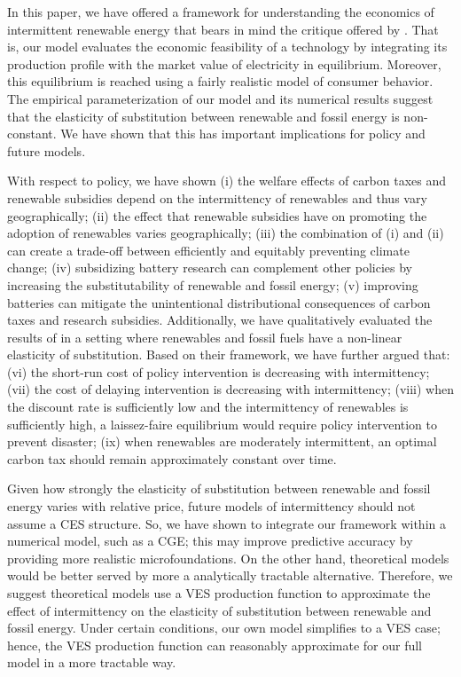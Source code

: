 \documentclass[11pt,a4paper,leqno]{extarticle}
\begin{document}
	
	In this paper, we have offered a framework for understanding the economics of intermittent renewable energy that bears in mind the critique offered by \citet{Joskow2011}. That is, our model evaluates the economic feasibility of a technology by integrating its production profile with the market value of electricity in equilibrium. Moreover, this equilibrium is reached using a fairly realistic model of consumer behavior. The empirical parameterization of our model and its numerical results suggest that the elasticity of substitution between renewable and fossil energy is non-constant. We have shown that this has important implications for policy and future models. 
	
	With respect to policy, we have shown (i) the welfare effects of carbon taxes and renewable subsidies depend on the intermittency of renewables and thus vary geographically; (ii) the effect that renewable subsidies have on promoting the adoption of renewables varies geographically; (iii) the combination of (i) and (ii) can create a trade-off between efficiently and equitably preventing climate change; (iv) subsidizing battery research can complement other policies by increasing the substitutability of renewable and fossil energy; (v) improving batteries can mitigate the unintentional distributional consequences of carbon taxes and research subsidies.  Additionally, we have qualitatively evaluated the results of \citet{Ace2012} in a setting where renewables and fossil fuels have a non-linear elasticity of substitution. Based on their framework, we have further argued that: (vi) the short-run cost of policy intervention is decreasing with intermittency;  (vii) the cost of delaying intervention is decreasing with intermittency; (viii) when the discount rate is sufficiently low and the intermittency of renewables is sufficiently high, a laissez-faire equilibrium would require policy intervention to prevent disaster; (ix) when renewables are moderately intermittent, an optimal carbon tax should remain approximately constant over time. 
	
	Given how strongly the elasticity of substitution between renewable and fossil energy varies with relative price, future models of intermittency should not assume a CES structure. So, we have shown to integrate our framework within a numerical model, such as a CGE; this may improve predictive accuracy by providing more realistic microfoundations. On the other hand, theoretical models would be better served by more a analytically tractable alternative. Therefore, we suggest theoretical models use a VES production function to approximate the effect of intermittency on the elasticity of substitution between renewable and fossil energy. Under certain conditions, our own model simplifies to a VES case; hence, the VES production function can reasonably approximate for our full model in a more tractable way. 
	
\end{document}
